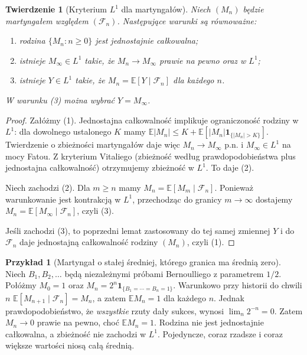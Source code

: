 \documentclass[11pt,a4paper,oneside]{report}
\numberwithin{equation}{chapter}
\theoremstyle{plain}
\newtheorem{twierdzenie}{Twierdzenie}[chapter]
\theoremstyle{definition}
\newtheorem{przyklad}{Przykład}[chapter]
\theoremstyle{remark}
\newcommand{\E}{\mathbb{E}}
\newcommand{\ind}[1]{\mathbf{1}_{#1}}
\begin{document}
\begin{twierdzenie}[Kryterium $L^1$ dla martyngałów]
Niech $(M_n)$ będzie martyngałem względem
$(\mathcal F_n)$. Następujące warunki są równoważne:
\begin{enumerate}
\item rodzina $\{M_n:n\geq0\}$ jest jednostajnie całkowalna;
\item istnieje $M_\infty\in L^1$ takie, że
$M_n\to M_\infty$ prawie na pewno oraz w $L^1$;
\item istnieje $Y\in L^1$ takie, że
$M_n=\E[Y\mid\mathcal F_n]$ dla każdego $n$.
\end{enumerate}
W warunku (3) można wybrać $Y=M_\infty$.
\end{twierdzenie}
\begin{proof}
Załóżmy (1). Jednostajna całkowalność implikuje
ograniczoność rodziny w $L^1$:
dla dowolnego ustalonego $K$ mamy
$\E|M_n|\leq K+\E[|M_n|\ind{\{|M_n|>K\}}]$.
Twierdzenie o zbieżności martyngałów daje więc
$M_n\to M_\infty$ p.n. i $M_\infty\in L^1$
na mocy Fatou. Z kryterium Vitaliego
(zbieżność według prawdopodobieństwa plus
jednostajna całkowalność) otrzymujemy zbieżność
w $L^1$. To daje (2).

Niech zachodzi (2). Dla $m\geq n$ mamy
$M_n=\E[M_m\mid\mathcal F_n]$.
Ponieważ warunkowanie jest kontrakcją w $L^1$,
przechodząc do granicy $m\to\infty$ dostajemy
$M_n=\E[M_\infty\mid\mathcal F_n]$,
czyli (3).

Jeśli zachodzi (3), to poprzedni lemat
zastosowany do tej samej zmiennej $Y$
i do $\mathcal F_n$ daje jednostajną całkowalność
rodziny $(M_n)$, czyli (1).
\end{proof}

\begin{przyklad}[Martyngał o stałej średniej, którego granica ma średnią zero]
Niech $B_1,B_2,\ldots$ będą niezależnymi
próbami Bernoulliego z parametrem $1/2$.
Połóżmy
$M_0=1$ oraz
$M_n=2^n\ind{\{B_1=\cdots=B_n=1\}}$.
Warunkowo przy historii do chwili $n$
$\E[M_{n+1}\mid\mathcal F_n]=M_n$,
a zatem $\E M_n=1$ dla każdego $n$.
Jednak prawdopodobieństwo, że \emph{wszystkie}
rzuty dały sukces, wynosi
$\lim_n2^{-n}=0$. Zatem $M_n\to0$ prawie na
pewno, choć $\E M_n=1$. Rodzina nie jest
jednostajnie całkowalna, a zbieżność nie
zachodzi w $L^1$. Pojedyncze, coraz rzadsze
i coraz większe wartości niosą całą średnią.
\end{przyklad}
\end{document}

